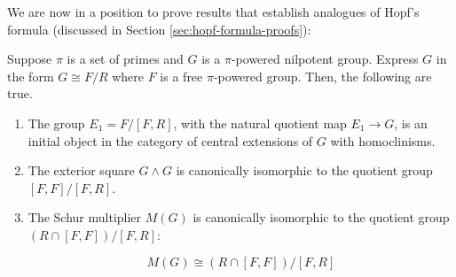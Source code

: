 We are now in a position to prove results that establish analogues of
Hopf's formula (discussed in Section \ref{sec:hopf-formula-proofs}):

\begin{theorem}
  Suppose $\pi$ is a set of primes and $G$ is a $\pi$-powered
  nilpotent group. Express $G$ in the form $G \cong F/R$ where $F$ is
  a free $\pi$-powered group. Then, the following are true.

  \begin{enumerate}
  \item The group $E_1 = F/[F,R]$, with the natural quotient map $E_1
    \to G$, is an initial object in the category of central extensions
    of $G$ with homoclinisms.
  \item The exterior square $G \wedge G$ is canonically isomorphic to
    the quotient group $[F,F]/[F,R]$.
  \item The Schur multiplier $M(G)$ is canonically isomorphic to the
    quotient group $(R \cap [F,F])/[F,R]$:

    \begin{equation}\label{eq:pi-powered-hopf-formula}
      M(G) \cong (R \cap [F,F])/[F,R]
    \end{equation}
  \end{enumerate}
\end{theorem}

